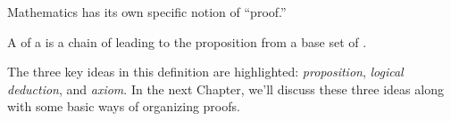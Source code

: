 Mathematics has its own specific notion of ``proof.''

\begin{definition*}
A  of a  is a chain of  leading to the proposition from a base set of .
\end{definition*}

The three key ideas in this definition are highlighted:
\emph{proposition}, \emph{logical deduction}, and \emph{axiom}.
In the next Chapter, we'll discuss these
three ideas along with some basic ways of organizing proofs.

\begin{problems}
\classproblems
{}
\end{problems}
